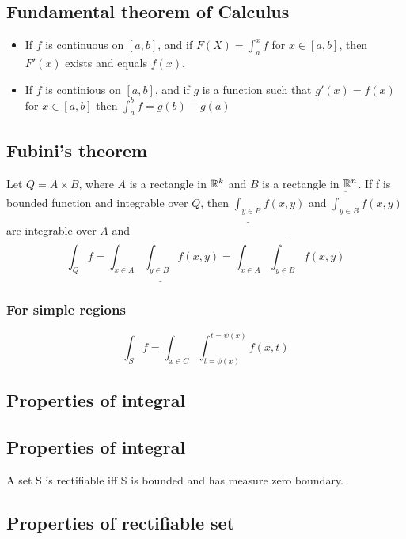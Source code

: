 \subsection{Fundamental theorem of Calculus}
\begin{itemize}
\item
	If $f$ is continuous on $[a, b]$, and if $F(X)=\int_a^x f$
	for $x\in[a,b]$, then $F'(x)$ exists and equals $f(x)$.
\item
	If $f$ is continious on $[a, b]$,
	and if $g$ is a function such that
	$g'(x)=f(x)$ for $x\in[a,b]$ then $\int_a^b f = g(b) - g(a)$
\end{itemize}


\subsection{Fubini's theorem}
Let $Q=A\times B$, where $A$ is a rectangle in ${\mathbb R}^k$ and $B$ is a rectangle in ${\mathbb R}^n$.
If f is bounded function and integrable over $Q$, then
$\underline{\int_{y\in B}} f(x,y)$ and $\overline{\int_{y\in B}} f(x,y)$ are integrable over $A$
and
\[\int_Q f = \int_{x\in A}\underline{\int_{y\in B}} f(x,y) = \int_{x\in A}\overline{\int_{y\in B}} f(x,y)\]

\subsubsection{For simple regions}
\TODO{}

\[\int_S f = \int_{x\in C}\int_{t=\phi(x)}^{t=\psi(x)} f(x,t)\]


\subsection{Properties of integral}
\TODO{}

\subsection{Properties of integral}
\TODO A set S is rectifiable iff S is bounded and has measure zero boundary.

\subsection{Properties of rectifiable set}
\TODO{}

